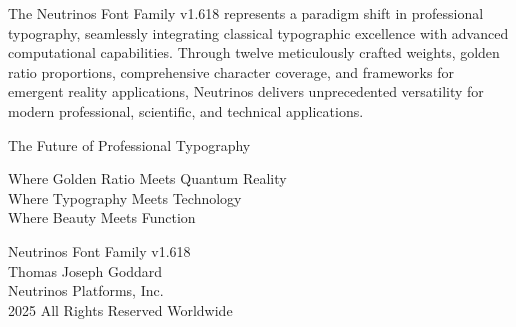 \documentclass[11pt,letterpaper]{article}
\newcommand{\goldenratio}{\varphi}
\begin{document}
The Neutrinos Font Family v1.618 represents a paradigm shift in professional typography, seamlessly integrating classical typographic excellence with advanced computational capabilities. Through twelve meticulously crafted weights, golden ratio proportions, comprehensive character coverage, and frameworks for emergent reality applications, Neutrinos delivers unprecedented versatility for modern professional, scientific, and technical applications.

\begin{center}
\end{center}

\vspace{20pt}

\begin{center}
{\blackfont\LARGE The Future of Professional Typography}

\vspace{10pt}

{\mediumfont\large
Where Golden Ratio Meets Quantum Reality\\
Where Typography Meets Technology\\
Where Beauty Meets Function
}

\vspace{20pt}

{\semiboldfont
Neutrinos Font Family v1.618\\[5pt]
Thomas Joseph Goddard\\
Neutrinos Platforms, Inc.\\[5pt]
\textcopyright{} 2025 All Rights Reserved Worldwide
}
\end{center}
\end{document}
